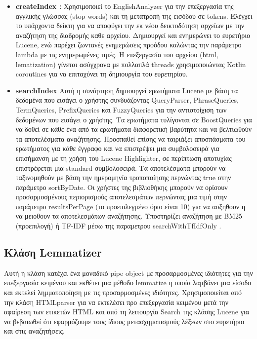 \documentclass[conference]{IEEEtran}
\begin{document}
{{            \begin{itemize}
                \item \textbf{createIndex :}{
                    Χρησιμοποιεί το EnglishAnalyzer για την επεξεργασία της αγγλικής γλώσσας (stop words) και τη μετατροπή της εισόδου σε tokens.
                    Ελέγχει το υπάρχοντα δείκτη για να αποφύγει την εκ νέου δεικτοδότηση αρχείων με την αναζήτηση της διαδρομής καθε αρχείου.
                    Δημιουργεί και ενημερώνει το ευρετήριο Lucene, ενώ παρέχει ζωντανές ενημερώσεις προόδου καλώντας την παράμετρο lambda με τις ενημερωμένες τιμές.
                    Η επεξεργασία του αρχείου (html, lematization) γίνεται ασύγχρονα με πολλαπλά threads χρησιμοποιώντας Kotlin coroutines για να επιταχύνει τη δημιουργία του ευρετηρίου.
                }

                \item \textbf{searchIndex}{
                    Αυτή η συνάρτηση δημιουργεί ερωτήματα Lucene με βάση τα δεδομένα που εισάγει ο χρήστης συνδυάζοντας QueryParser, PhraseQueries, TermQueries, PrefixQueries και FuzzyQueries για την αντιστοίχιση των δεδομένων που εισάγει ο χρήστης.
                    Τα ερωτήματα τυλίγονται σε BoostQueries για να δοθεί σε κάθε ένα από τα ερωτήματα διαφορετική βαρύτητα και να βελτιωθούν τα αποτελέσματα αναζήτησης.
                    Προσπαθεί επίσης να ταιριάξει αποσπάσματα του ερωτήματος για κάθε έγγραφο και να επιστρέψει μια συμβολοσειρά για επισήμανση με τη χρήση του Lucene Highlighter, σε περίπτωση αποτυχίας επιστρέφεται μια standard συμβολοσειρά.
                    Τα αποτελέσματα μπορούν να ταξινομηθούν με βάση την ημερομηνία τροποποίησης περνώντας true στην παράμετρο sortByDate.
                    Οι χρήστες της βιβλιοθήκης μπορούν να ορίσουν προσαρμοσμένους περιορισμούς αποτελεσμάτων περνώντας μια τιμή στην παράμετρο resultsPerPage (το προεπιλεγμένο όριο είναι 10) για να αυξηθουν η να μειοθουν τα αποτελεσμάτων αναζήτησης.
                    Υποστηρίζει αναζήτηση με BM25 (προεπιλογή) ή TF-IDF μέσω της παραμετρου searchWithTfIdfOnly .
                }

            \end{itemize}}\label{lucene-class}
        \subsection{\textbf{Κλάση Lemmatizer}}{Αυτή η κλάση κατέχει ένα μοναδικό pipe object με προσαρμοσμένες ιδιότητες για την επεξεργασία κειμένου και εκθέτει μια μέθοδο lemmatize η οποία λαμβάνει μια είσοδο και εκτελεί λημματοποίηση με τις προσαρμοσμένες ιδιότητες.
        Χρησιμοποιείται από την κλάση HTMLparser για να εκτελέσει προ επεξεργασία κειμένου μετά την αφαίρεση των ετικετών HTML και από τη λειτουργία Search της κλάσης Lucene για να βεβαιωθεί ότι εφαρμόζουμε τους ίδιους μετασχηματισμούς λέξεων στο ευρετήριο και στις αναζητήσεις.
        }\label{lemmatizer-class}

}
\end{document}
